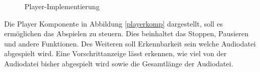 \begin{figure}[ht]
\begin{minipage}[b]{0.45\linewidth}
\caption{Player-Implementierung}
\label{player}
\end{minipage}
\end{figure}

Die Player Komponente in Abbildung \ref{playerkomp} dargestellt, soll es ermöglichen das Abspielen zu steuern. Dies beinhaltet das Stoppen, Pausieren und andere Funktionen. Des Weiteren soll Erkennbarkeit sein welche Audiodatei abgespielt wird. Eine Vorschrittanzeige lässt erkennen, wie viel von der Audiodatei bisher abgespielt wird sowie die Gesamtlänge der Audiodatei.

